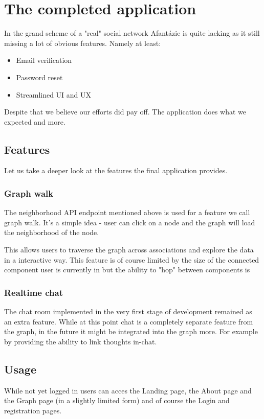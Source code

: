 \chapter{The completed application}
In the grand scheme of a "real" social network Afantázie is quite lacking as it still missing a lot of obvious features.
Namely at least:
\begin{itemize}
    \item Email verification 
    \item Password reset
    \item Streamlined UI and UX
\end{itemize}

Despite that we believe our efforts did pay off.
The application does what we expected and more.

\section{Features}
Let us take a deeper look at the features the final application provides.

\subsection{Graph walk}
The neighborhood API endpoint mentioned above is used for a feature we call graph walk.
It's a simple idea - user can click on a node and the graph will load the neighborhood of the node.

This allows users to traverse the graph across associations and explore the data in a interactive way.
This feature is of course limited by the size of the connected component user is currently in but the ability to "hop" between components is 

\subsection{Realtime chat}
The chat room implemented in the very first stage of development remained as an extra feature.
While at this point chat is a completely separate feature from the graph, in the future it might be integrated into the graph more.
For example by providing the ability to link thoughts in-chat.


\section{Usage}
While not yet logged in users can acces the Landing page, the About page and the Graph page (in a slightly limited form) and of course the Login and registration pages.

